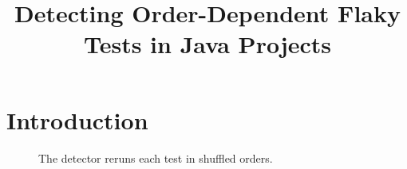 \documentclass[10pt,conference]{IEEEtran}
\begin{document}
\title{Detecting Order-Dependent Flaky Tests in Java Projects}
\author{}
\maketitle
\section{Introduction}
\lipsum[1-2]
\begin{figure}[t]
\centering
{}
\caption{The detector reruns each test in shuffled orders.}
\end{figure}
\lipsum[3-4]
\end{document}
